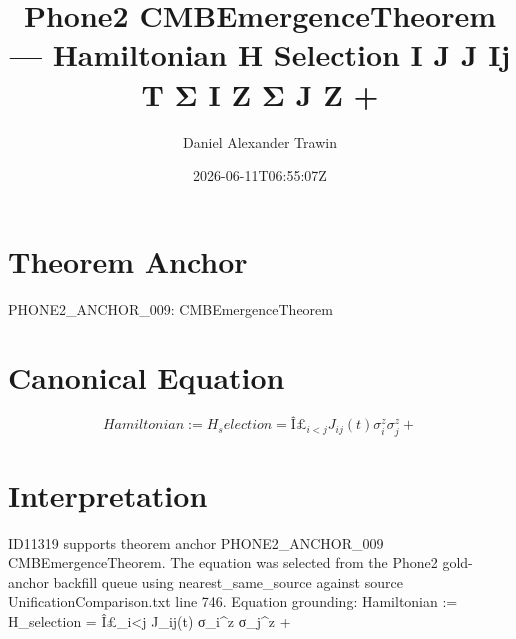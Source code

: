 \documentclass[11pt]{article}
\title{Phone2 CMBEmergenceTheorem — Hamiltonian H Selection I J J Ij T Σ I Z Σ J Z +}
\author{Daniel Alexander Trawin}
\date{2026-06-11T06:55:07Z}
\begin{document}
\maketitle
\section*{Theorem Anchor}
PHONE2_ANCHOR_009: CMBEmergenceTheorem
\section*{Canonical Equation}
\[
Hamiltonian := H_selection = Î£_{i<j} J_{ij}(t) σ_i^z σ_j^z +
\]
\section*{Interpretation}
ID11319 supports theorem anchor PHONE2_ANCHOR_009 CMBEmergenceTheorem. The equation was selected from the Phone2 gold-anchor backfill queue using nearest_same_source against source UnificationComparison.txt line 746. Equation grounding: Hamiltonian := H_selection = Î£_{i<j} J_{ij}(t) σ_i^z σ_j^z +
\end{document}

